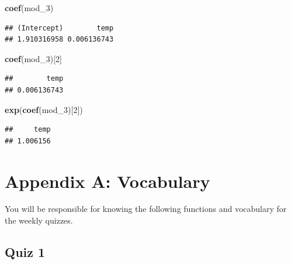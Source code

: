 \documentclass[]{book}
\makeatletter
\newenvironment{Shaded}{\begin{snugshade}}{\end{snugshade}}
\newcommand{\KeywordTok}[1]{\textcolor[rgb]{0.13,0.29,0.53}{\textbf{#1}}}
\newcommand{\DecValTok}[1]{\textcolor[rgb]{0.00,0.00,0.81}{#1}}
\newcommand{\NormalTok}[1]{#1}
\newenvironment{kframe}{%
\medskip{}
\setlength{\fboxsep}{.8em}
 \def\at@end@of@kframe{}%
 \ifinner\ifhmode%
  \def\at@end@of@kframe{\end{minipage}}%
  \begin{minipage}{\columnwidth}%
 \fi\fi%
 \def\FrameCommand##1{\hskip\@totalleftmargin \hskip-\fboxsep
 \colorbox{shadecolor}{##1}\hskip-\fboxsep
     \hskip-\linewidth \hskip-\@totalleftmargin \hskip\columnwidth}%
 \MakeFramed {\advance\hsize-\width
   \@totalleftmargin\z@ \linewidth\hsize
   \@setminipage}}%
 {\par\unskip\endMakeFramed%
 \at@end@of@kframe}
\renewenvironment{Shaded}{\begin{kframe}}{\end{kframe}}
\theoremstyle{definition}
\theoremstyle{definition}
\theoremstyle{definition}
\theoremstyle{remark}
\makeatother
\begin{document}
\begin{Shaded}
\begin{Highlighting}[]
\KeywordTok{coef}\NormalTok{(mod_}\DecValTok{3}\NormalTok{)}
\end{Highlighting}
\end{Shaded}

\begin{verbatim}
## (Intercept)        temp 
## 1.910316958 0.006136743
\end{verbatim}

\begin{Shaded}
\begin{Highlighting}[]
\KeywordTok{coef}\NormalTok{(mod_}\DecValTok{3}\NormalTok{)[}\DecValTok{2}\NormalTok{]}
\end{Highlighting}
\end{Shaded}

\begin{verbatim}
##        temp 
## 0.006136743
\end{verbatim}

\begin{Shaded}
\begin{Highlighting}[]
\KeywordTok{exp}\NormalTok{(}\KeywordTok{coef}\NormalTok{(mod_}\DecValTok{3}\NormalTok{)[}\DecValTok{2}\NormalTok{])}
\end{Highlighting}
\end{Shaded}

\begin{verbatim}
##     temp 
## 1.006156
\end{verbatim}

\appendix


\chapter{Appendix A: Vocabulary}\label{appendix-a-vocabulary}

You will be responsible for knowing the following functions and
vocabulary for the weekly quizzes.

\section{Quiz 1}\label{quiz-1}
\end{document}

